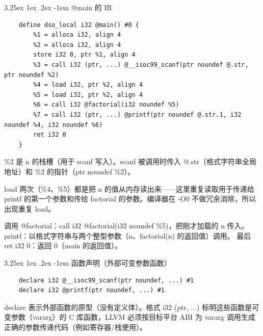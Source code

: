 \documentclass[a4paper]{article}
\makeatletter
\renewcommand\paragraph{\@startsection{paragraph}{5}{\z@}%
	{3.25ex \@plus1ex \@minus.2ex}%
	{-1em}%
	{\normalfont\normalsize\bfseries}}
\makeatother
\begin{document}
\paragraph{@main 的 IR}
\begin{lstlisting}
	define dso_local i32 @main() #0 {
		%1 = alloca i32, align 4
		%2 = alloca i32, align 4
		store i32 0, ptr %1, align 4
		%3 = call i32 (ptr, ...) @__isoc99_scanf(ptr noundef @.str, ptr noundef %2)
		%4 = load i32, ptr %2, align 4
		%5 = load i32, ptr %2, align 4
		%6 = call i32 @factorial(i32 noundef %5)
		%7 = call i32 (ptr, ...) @printf(ptr noundef @.str.1, i32 noundef %4, i32 noundef %6)
		ret i32 0
	}
\end{lstlisting}
\%2 是 n 的栈槽（用于 scanf 写入）。scanf 被调用时传入 @.str（格式字符串全局地址）和 \%2 的指针（ptr noundef \%2）。

load 两次（\%4、\%5）都是把 n 的值从内存读出来——这里重复读取用于传递给 printf 的第一个参数和传给 factorial 的参数。编译器在 -O0 不做冗余消除，所以出现重复 load。

调用 @factorial：call i32 @factorial(i32 noundef \%5)，把刚才加载的 n 传入。
printf：以格式字符串与两个整型参数（n、factorial(n) 的返回值）调用。
最后 ret i32 0：返回 0（main 的返回值）。

\paragraph{函数声明（外部可变参数函数）}
\begin{lstlisting}
	declare i32 @__isoc99_scanf(ptr noundef, ...) #1
	declare i32 @printf(ptr noundef, ...) #1
\end{lstlisting}
declare 表示外部函数的原型（没有定义体）。格式 i32 (ptr, ...) 标明这些函数是可变参数（vararg）的 C 库函数，LLVM 必须按目标平台 ABI 为 vararg 调用生成正确的参数传递代码（例如寄存器/栈使用）。
\end{document}
